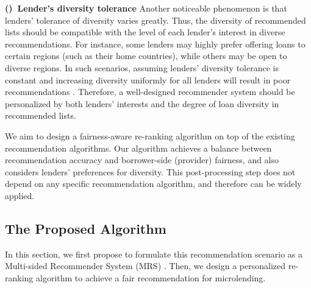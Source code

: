 
\textbf{()~Lender's diversity tolerance} Another noticeable phenomenon is that lenders' tolerance of diversity varies greatly.  Thus, the diversity of recommended lists should be compatible with the level of each lender's interest in diverse recommendations. For instance, some lenders may highly prefer offering loans to certain regions (such as their home countries), while others may be open to diverse regions. In such scenarios, assuming lenders' diversity tolerance is constant and increasing diversity uniformly for all lenders will result in poor recommendations \cite{eskandanian2017clustering}. Therefore, a well-designed recommender system should be personalized by both lenders' interests and the degree of loan diversity in recommended lists.

We aim to design a fairness-aware re-ranking algorithm on top of the existing recommendation algorithms. Our algorithm achieves a balance between recommendation accuracy and borrower-side (provider) fairness, and also considers lenders' preferences for diversity. This post-processing step does not depend on any specific recommendation algorithm, and therefore can be widely applied.


\subsection{The Proposed Algorithm}
\label{subsec:far_algorithm}
In this section, we first propose to formulate this recommendation scenario as a Multi-sided Recommender System (MRS) \cite{burke2017multisided, burke2017patterns}. Then, we design a personalized re-ranking algorithm to achieve a fair recommendation for microlending.

